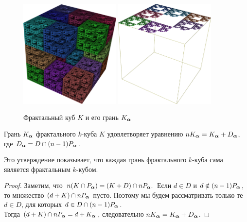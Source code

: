 \begin{figure}[h!]
\centering
\includegraphics[width=0.45\textwidth]{images/presentation/qK.png}
 \hfill
 \includegraphics[width=0.45\textwidth]{images/presentation/qK_a.png}
  \caption{Фрактальный куб $K$ и его грань $K_{\bm{\alpha}}$}
 \label{fig:qK_a}
\end{figure}

\begin{proposition}\label{prop:Ka}
Грань $K_{\bm{\alpha}}$ фрактального $k$-куба $K$ удовлетворяет уравнению $n K_{\bm{\alpha}}=K_{\bm{\alpha}}+D_{\bm{\alpha}}$, где $D_{\bm{\alpha}}=D\cap(n-1)P_{\bm{\alpha}}$.
\end{proposition}

Это утверждение показывает, что каждая грань фрактального $k$-куба сама является фрактальным $k$-кубом.

\begin{proof}
Заметим, что $n(K\cap P_{\bm{\alpha}})=(K+D)\cap nP_{\bm{\alpha}}.$ 
Если $d\in D$ и \linebreak $d\notin(n-1)P_{\bm{\alpha}}$, то множество $(d+K)\cap nP_{\bm{\alpha}}$ пусто.
Поэтому мы будем рассматривать только те $d\in D$, для которых $d\in D\cap (n-1)P_{\bm{\alpha}}$.\\ 
Тогда $(d+K)\cap nP_{\bm{\alpha}}=d+K_{\bm{\alpha}}$, следовательно $n K_{\bm{\alpha}}={K_{\bm{\alpha}}+D_{\bm{\alpha}}}$.
\end{proof}

